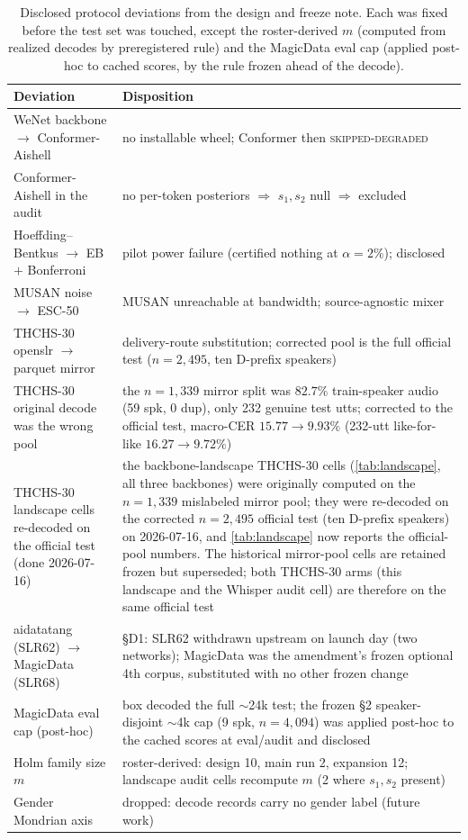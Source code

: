 \documentclass[11pt]{article}
\begin{document}
\begin{table}[h]
  \centering
  \caption{Disclosed protocol deviations from the design and freeze note. Each was
  fixed before the test set was touched, except the roster-derived $m$ (computed from
  realized decodes by preregistered rule) and the MagicData eval cap (applied post-hoc to
  cached scores, by the rule frozen ahead of the decode).}
  \label{tab:deviations}
  \small
  \begin{tabular}{p{}p{}}
    \toprule
    Deviation & Disposition \\
    \midrule
    WeNet backbone $\to$ Conformer-Aishell & no installable wheel; Conformer then \textsc{skipped-degraded} \\
    Conformer-Aishell in the audit & no per-token posteriors $\Rightarrow$ $s_1,s_2$ null $\Rightarrow$ excluded \\
    Hoeffding--Bentkus $\to$ EB $+$ Bonferroni & pilot power failure (certified nothing at $\alpha{=}2\%$); disclosed \\
    MUSAN noise $\to$ ESC-50 & MUSAN unreachable at bandwidth; source-agnostic mixer \\
    THCHS-30 openslr $\to$ parquet mirror & delivery-route substitution; corrected pool is the full official test ($n{=}2{,}495$, ten D-prefix speakers) \\
    THCHS-30 original decode was the wrong pool & the $n{=}1{,}339$ mirror split was $82.7\%$ train-speaker audio (59 spk, 0 dup), only 232 genuine test utts; corrected to the official test, macro-CER $15.77\!\to\!9.93\%$ (232-utt like-for-like $16.27\!\to\!9.72\%$) \\
    THCHS-30 landscape cells re-decoded on the official test (done 2026-07-16) & the backbone-landscape THCHS-30 cells (\cref{tab:landscape}, all three backbones) were originally computed on the $n{=}1{,}339$ mislabeled mirror pool; they were re-decoded on the corrected $n{=}2{,}495$ official test (ten D-prefix speakers) on 2026-07-16, and \cref{tab:landscape} now reports the official-pool numbers. The historical mirror-pool cells are retained frozen but superseded; both THCHS-30 arms (this landscape and the Whisper audit cell) are therefore on the same official test \\
    aidatatang (SLR62) $\to$ MagicData (SLR68) & \S D1: SLR62 withdrawn upstream on launch day (two networks); MagicData was the amendment's frozen optional 4th corpus, substituted with no other frozen change \\
    MagicData eval cap (post-hoc) & box decoded the full $\sim$24k test; the frozen \S 2 speaker-disjoint $\sim$4k cap (9 spk, $n{=}4{,}094$) was applied post-hoc to the cached scores at eval/audit and disclosed \\
    Holm family size $m$ & roster-derived: design 10, main run 2, expansion 12; landscape audit cells recompute $m$ (2 where $s_1,s_2$ present) \\
    Gender Mondrian axis & dropped: decode records carry no gender label (future work) \\
    \bottomrule
  \end{tabular}
\end{table}
\end{document}
